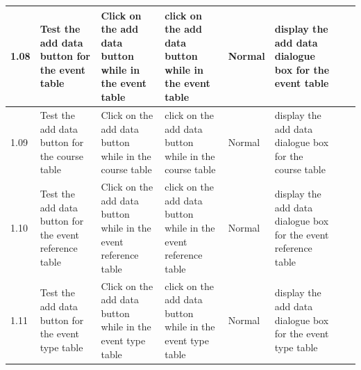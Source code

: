 \begin{landscape}
\begin{center}
\begin{longtable}{|p{1.5cm}|p{2.5cm}|p{2.5cm}|p{2cm}|p{2cm}|p{2cm}|p{2cm}|p{2cm}|}
        \rowcolor{DarkGrey}1.08 & Test the add data button for the event  table & Click on the add data button while in the event table & click on the add data button while in the event table & Normal & display the add data dialogue box for the event  table & & \\ \hline
        \rowcolor{DarkGrey}1.09 & Test the add data button for the course  table & Click on the add data button while in the course table & click on the add data button while in the course table & Normal & display the add data dialogue box for the course  table & & \\ \hline
        \rowcolor{DarkGrey}1.10 & Test the add data button for the event reference  table & Click on the add data button while in the event reference table & click on the add data button while in the event reference table & Normal & display the add data dialogue box for the event reference  table & & \\ \hline
        \rowcolor{DarkGrey}1.11 & Test the add data button for the event type  table & Click on the add data button while in the event type table & click on the add data button while in the event type table & Normal & display the add data dialogue box for the event type  table & & \\ \hline
        

\end{longtable}
\end{center}
\end{landscape}
